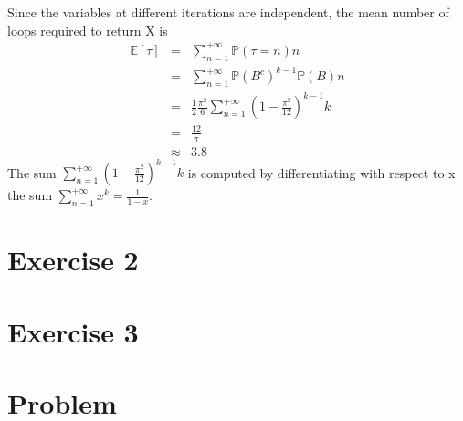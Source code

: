 Since the variables at different iterations are independent, the mean number of loops required to return X is 
\begin{eqnarray*}
	\mathbb{E}[\tau]&=&\sum_{n=1}^{+\infty}\mathbb{P}(\tau=n)n\\
	&=&\sum_{n=1}^{+\infty}\mathbb{P}(B^{c})^{k-1}\mathbb{P}(B)n\\
	&=&\frac{1}{2}\frac{\pi^{2}}{6}\sum_{n=1}^{+\infty}(1-\frac{\pi^{2}}{12})^{k-1}k\\
	&=&\frac{12}{\pi}\\
	&\approx& 3.8
\end{eqnarray*}
The sum $\sum_{n=1}^{+\infty}(1-\frac{\pi^{2}}{12})^{k-1}k$ is computed by differentiating with respect to x the sum $\sum_{n=1}^{+\infty}x^{k}=\frac{1}{1-x}$.



\section*{Exercise 2}
\section*{Exercise 3}
\section*{Problem}
%


